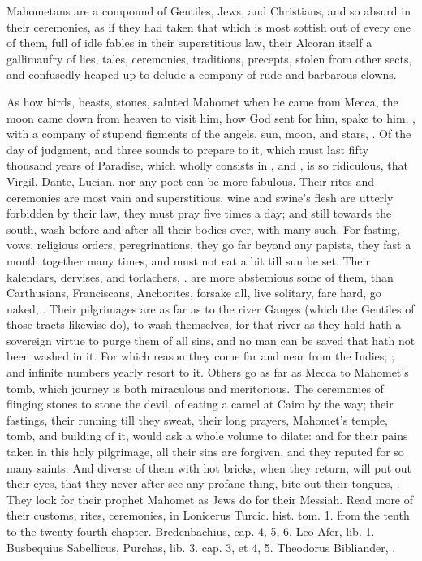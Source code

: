 {Mahometans are a compound of Gentiles, Jews, and Christians, and so
absurd in their ceremonies, as if they had taken that which is most
sottish out of every one of them, full of idle fables in their
superstitious law, their Alcoran itself a gallimaufry of lies, tales,
ceremonies, traditions, precepts, stolen from other sects, and
confusedly heaped up to delude a company of rude and barbarous clowns.

As how birds, beasts, stones, saluted Mahomet when he came from Mecca,
the moon came down from heaven to visit him, how God sent for
him, spake to him, \etc{}, with a company of stupend figments of the
angels, sun, moon, and stars, \etc{}. Of the day of judgment, and three
sounds to prepare to it, which must last fifty thousand years of
Paradise, which wholly consists in , and
, is so ridiculous,
that Virgil, Dante, Lucian, nor any poet can be more fabulous. Their
rites and ceremonies are most vain and superstitious, wine and swine's
flesh are utterly forbidden by their law, they must pray five
times a day; and still towards the south, wash before and after all
their bodies over, with many such. For fasting, vows, religious orders,
peregrinations, they go far beyond any papists, they fast a month
together many times, and must not eat a bit till sun be set. Their
kalendars, dervises, and torlachers, \etc{}. are more abstemious some
of them, than Carthusians, Franciscans, Anchorites, forsake all, live
solitary, fare hard, go naked, \etc{}. Their pilgrimages are as far
as to the river Ganges (which the Gentiles of those tracts
likewise do), to wash themselves, for that river as they hold hath a
sovereign virtue to purge them of all sins, and no man can be saved
that hath not been washed in it. For which reason they come far and
near from the Indies; ; and
infinite numbers yearly resort to it. Others go as far as Mecca to
Mahomet's tomb, which journey is both miraculous and meritorious. The
ceremonies of flinging stones to stone the devil, of eating a camel at
Cairo by the way; their fastings, their running till they sweat, their
long prayers, Mahomet's temple, tomb, and building of it, would ask a
whole volume to dilate: and for their pains taken in this holy
pilgrimage, all their sins are forgiven, and they reputed for so many
saints. And diverse of them with hot bricks, when they return, will put
out their eyes, that they never after see any profane thing, bite
out their tongues, \etc{}. They look for their prophet Mahomet as Jews do
for their Messiah. Read more of their customs, rites, ceremonies, in
Lonicerus \textlatin{Turcic. hist. tom. 1.} from the tenth to the twenty-fourth
chapter. Bredenbachius, \textlatin{cap. 4, 5, 6.} Leo Afer, \textlatin{lib. 1.} Busbequius
Sabellicus, Purchas, \textlatin{lib. 3. cap. 3, et 4, 5.} Theodorus Bibliander, \etc{}.

}
